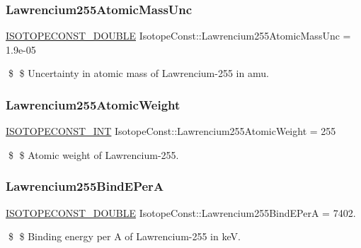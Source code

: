 \subsubsection{\texorpdfstring{Lawrencium255\+Atomic\+Mass\+Unc}{Lawrencium255AtomicMassUnc}}
{\footnotesize\ttfamily \mbox{\hyperlink{group___isotope_const-_macros_ga8f45a7272ce02c0b4c65c44636ed719a}{I\+S\+O\+T\+O\+P\+E\+C\+O\+N\+S\+T\+\_\+\+D\+O\+U\+B\+LE}} Isotope\+Const\+::\+Lawrencium255\+Atomic\+Mass\+Unc = 1.\+9e-\/05}

\$ \$ Uncertainty in atomic mass of Lawrencium-\/255 in amu. \mbox{\label{group___isotope_const-_lawrencium-_lr255_ga0ebbef385eeb6212a412a08385a91634}} 
\subsubsection{\texorpdfstring{Lawrencium255\+Atomic\+Weight}{Lawrencium255AtomicWeight}}
{\footnotesize\ttfamily \mbox{\hyperlink{group___isotope_const-_macros_ga5f18360b3e99483a35c32d789e62621c}{I\+S\+O\+T\+O\+P\+E\+C\+O\+N\+S\+T\+\_\+\+I\+NT}} Isotope\+Const\+::\+Lawrencium255\+Atomic\+Weight = 255}

\$ \$ Atomic weight of Lawrencium-\/255. \mbox{\label{group___isotope_const-_lawrencium-_lr255_ga0e0eb6a388c6792b31e71b3dc09f0ce0}} 
\subsubsection{\texorpdfstring{Lawrencium255\+Bind\+E\+PerA}{Lawrencium255BindEPerA}}
{\footnotesize\ttfamily \mbox{\hyperlink{group___isotope_const-_macros_ga8f45a7272ce02c0b4c65c44636ed719a}{I\+S\+O\+T\+O\+P\+E\+C\+O\+N\+S\+T\+\_\+\+D\+O\+U\+B\+LE}} Isotope\+Const\+::\+Lawrencium255\+Bind\+E\+PerA = 7402.}

\$ \$ Binding energy per A of Lawrencium-\/255 in keV. \mbox{\label{group___isotope_const-_lawrencium-_lr255_ga29c551a19650342ae5805c5b38da22f7}} 
